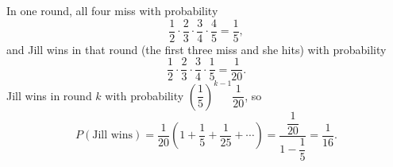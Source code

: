 In one round, all four miss with probability
\[
\dfrac{1}{2}\cdot\dfrac{2}{3}\cdot\dfrac{3}{4}\cdot\dfrac{4}{5}=\dfrac{1}{5},
\]
and Jill wins in that round (the first three miss and she hits) with probability
\[
\dfrac{1}{2}\cdot\dfrac{2}{3}\cdot\dfrac{3}{4}\cdot\dfrac{1}{5}=\dfrac{1}{20}.
\]
Jill wins in round $k$ with probability $\left(\dfrac{1}{5}\right)^{k-1}\dfrac{1}{20}$, so
\[
P(\text{Jill wins})=\dfrac{1}{20}\left(1+\dfrac{1}{5}+\dfrac{1}{25}+\cdots\right)=\dfrac{\dfrac{1}{20}}{1-\dfrac{1}{5}}=\boxed{\dfrac{1}{16}}.
\]
